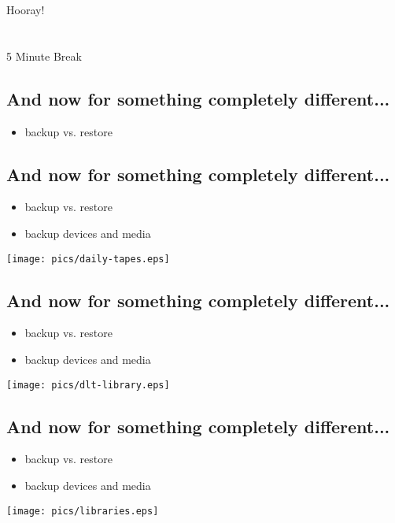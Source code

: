 \documentclass[xga]{xdvislides}
\begin{document}
\newpage
\vspace*{\fill}
\begin{center}
    \Hugesize
        Hooray! \\ [1em]
    \hspace*{5mm}
    \blueline\\
    \hspace*{5mm}\\
        5 Minute Break
\end{center}
\vspace*{\fill}

\subsection{And now for something completely different...}
\begin{itemize}
	\item backup vs. restore
\end{itemize}

\subsection{And now for something completely different...}
\begin{itemize}
	\item backup vs. restore
	\item backup devices and media
\end{itemize}
\vspace*{\fill}
\begin{center}
	\texttt{[image: pics/daily-tapes.eps]}
\end{center}
\vspace*{\fill}

\subsection{And now for something completely different...}
\begin{itemize}
	\item backup vs. restore
	\item backup devices and media
\end{itemize}
\vspace*{\fill}
\begin{center}
	\texttt{[image: pics/dlt-library.eps]}
\end{center}
\vspace*{\fill}

\subsection{And now for something completely different...}
\begin{itemize}
	\item backup vs. restore
	\item backup devices and media
\end{itemize}
\vspace*{\fill}
\begin{center}
	\texttt{[image: pics/libraries.eps]}
\end{center}
\vspace*{\fill}
\end{document}

